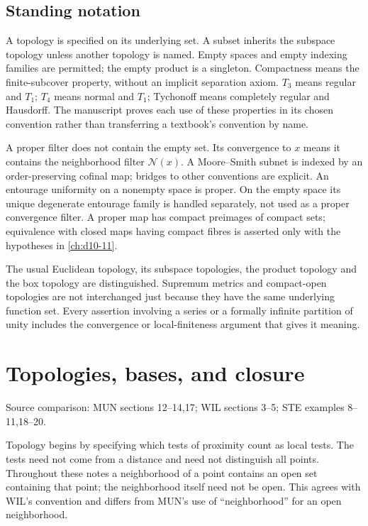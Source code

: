 \documentclass[11pt,oneside,openany]{book}
\theoremstyle{definition}
\theoremstyle{remark}
\newcounter{foundation}
\newcommand{\NN}{\mathcal N}\newcommand{\UU}{\mathcal U}
\newcommand{\source}[1]{\par\begingroup\small\sffamily\color{black!65}Source comparison: #1\par\endgroup}
\begin{document}
\section*{Standing notation}
A topology is specified on its underlying set. A subset inherits the subspace
topology unless another topology is named. Empty spaces and empty indexing
families are permitted; the empty product is a singleton. Compactness means the
finite-subcover property, without an implicit separation axiom. $T_3$ means
regular and $T_1$; $T_4$ means normal and $T_1$; Tychonoff means completely regular
and Hausdorff. The manuscript proves each use of these properties in its
chosen convention rather than transferring a textbook's convention by name.

A proper filter does not contain the empty set. Its convergence to $x$ means
it contains the neighborhood filter $\NN(x)$. A Moore--Smith subnet is indexed
by an order-preserving cofinal map; bridges to other conventions are explicit.
An entourage uniformity on a nonempty space is proper. On the empty space its
unique degenerate entourage family is handled separately, not used as a
proper convergence filter. A proper map has compact preimages of compact sets;
equivalence with closed maps having compact fibres is asserted only with the
hypotheses in \cref{ch:d10-11}.

The usual Euclidean topology, its subspace topologies, the product topology and
the box topology are distinguished. Supremum metrics and compact-open
topologies are not interchanged just because they have the same underlying
function set. Every assertion involving a series or a formally infinite
partition of unity includes the convergence or local-finiteness argument
that gives it meaning.


\mainmatter

\chapter{Topologies, bases, and closure}\label{ch:d10-01}
\source{MUN sections 12--14,17; WIL sections 3--5; STE examples 8--11,18--20.}

Topology begins by specifying which tests of proximity count as local tests. The tests need not come from a distance and need not distinguish all points. Throughout these notes a neighborhood of a point contains an open set containing that point; the neighborhood itself need not be open. This agrees with WIL's convention and differs from MUN's use of ``neighborhood'' for an open neighborhood.
\end{document}
